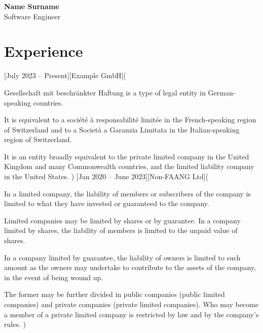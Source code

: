 \documentclass[a4paper,11pt]{article}
\begin{document}
\begin{center}
	\begin{minipage}{0.5\textwidth}
		{\Huge \bfseries Name Surname} \\
		\medskip
		{\Large Software Engineer}
	\end{minipage}
	\hfill
	\begin{minipage}{0.4\textwidth}
	\end{minipage}
\end{center}

\section{Experience}
[July 2023 -- Present][Example GmbH](
	\item Gesellschaft mit beschränkter Haftung is a type of legal entity in German-speaking countries.
	\item It is equivalent to a société à responsabilité limitée in the French-speaking region of Switzerland and to a Società a Garanzia Limitata in the Italian-speaking region of Switzerland.
	\item It is an entity broadly equivalent to the private limited company in the United Kingdom and many Commonwealth countries, and the limited liability company in the United States.
)
[Jan 2020 -- June 2023][Non-FAANG Ltd](
	\item In a limited company, the liability of members or subscribers of the company is limited to what they have invested or guaranteed to the company.
	\item Limited companies may be limited by shares or by guarantee. In a company limited by shares, the liability of members is limited to the unpaid value of shares.
	\item In a company limited by guarantee, the liability of owners is limited to such amount as the owners may undertake to contribute to the assets of the company, in the event of being wound up.
	\item The former may be further divided in public companies (public limited companies) and private companies (private limited companies). Who may become a member of a private limited company is restricted by law and by the company's rules.
)
\end{document}
